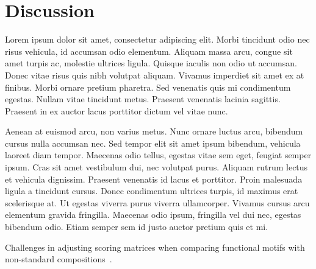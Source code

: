 \documentclass[onecolumn]{miniclass}
\begin{document}
\section{Discussion}
Lorem ipsum dolor sit amet, consectetur adipiscing elit. Morbi tincidunt odio nec risus vehicula, id accumsan odio elementum. Aliquam massa arcu, congue sit amet turpis ac, molestie ultrices ligula. Quisque iaculis non odio ut accumsan. Donec vitae risus quis nibh volutpat aliquam. Vivamus imperdiet sit amet ex at finibus. Morbi ornare pretium pharetra. Sed venenatis quis mi condimentum egestas. Nullam vitae tincidunt metus. Praesent venenatis lacinia sagittis. Praesent in ex auctor lacus porttitor dictum vel vitae nunc.

Aenean at euismod arcu, non varius metus. Nunc ornare luctus arcu, bibendum cursus nulla accumsan nec. Sed tempor elit sit amet ipsum bibendum, vehicula laoreet diam tempor. Maecenas odio tellus, egestas vitae sem eget, feugiat semper ipsum. Cras sit amet vestibulum dui, nec volutpat purus. Aliquam rutrum lectus et vehicula dignissim. Praesent venenatis id lacus et porttitor. Proin malesuada ligula a tincidunt cursus. Donec condimentum ultrices turpis, id maximus erat scelerisque at. Ut egestas viverra purus viverra ullamcorper. Vivamus cursus arcu elementum gravida fringilla. Maecenas odio ipsum, fringilla vel dui nec, egestas bibendum odio. Etiam semper sem id justo auctor pretium quis et mi.

Challenges in adjusting scoring matrices when comparing functional motifs with non-standard compositions~\cite{jarnot2024challenges}.



\end{document}

